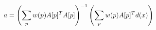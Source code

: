 \begin{equation}
    \small
    \label{eq:optimal-parameter-affine-weighted}
    a = \left (\sum_p w(p) A[p]^T A[p] \right )^{-1} \left (\sum_p w(p) A[p]^T d(x) \right)
\end{equation}